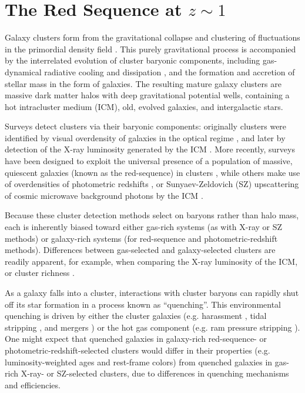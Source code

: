 \chapter{The Red Sequence at $z\sim1$}

Galaxy clusters form from the gravitational collapse and clustering of fluctuations in the primordial density field \citep{Press:1974aa,Gott:1975aa,Kravtsov:2012aa}.
This purely gravitational process is accompanied by the interrelated evolution of cluster baryonic components, including gas-dynamical radiative cooling and dissipation \citep{White:1978aa,Rudd:2008aa,Gnedin:2004aa,Kravtsov:2012aa}, and the formation and accretion of stellar mass in the form of galaxies. The resulting mature galaxy clusters are massive dark matter halos with deep gravitational potential wells, containing a hot intracluster medium (ICM), old, evolved galaxies, and intergalactic stars.

Surveys detect clusters via their baryonic components: originally clusters were identified by visual overdensity of galaxies in the optical regime \citep{Gunn:1986zm,Abell:1989lm,Lidman:1996uh,Ostrander:1998fx,Gal:2000lo}, and later by detection of the X-ray luminosity generated by the ICM \citep{Gioia:1994jm,Scharf:1997ws,Rosati:1998om,Romer:2000vp}. More recently, surveys have been designed to exploit the universal presence of a population of massive, quiescent galaxies (known as the red-sequence) in clusters \citep{Gladders:2000rq,Gladders:2005dp,Wilson:2009ws,Muzzin:2009jm,Rykoff:2014aa}, while others make use of overdensities of photometric redshifts \citep{Stanford:2005xr,Eisenhardt:2008pi}, or Sunyaev-Zeldovich (SZ) upscattering of cosmic microwave background photons by the ICM \citep{Reichardt:2013zn,Hasselfield:2013bs,Planck-Collaboration:2014aa,Bleem:2015sf}.

Because these cluster detection methods select on baryons rather than halo mass, each is inherently biased toward either gas-rich systems (as with X-ray or SZ methods) or galaxy-rich systems (for red-sequence and photometric-redshift methods).
Differences between gas-selected and galaxy-selected clusters are readily apparent, for example, when comparing the X-ray luminosity of the ICM, or cluster richness \citep{Donahue:2001fv,2008ApJ...675.1106R,Hicks:2013zl}.

As a galaxy falls into a cluster, interactions with cluster baryons can rapidly shut off its star formation in a process known as ``quenching''. This environmental quenching is driven by either the cluster galaxies (e.g. harassment \citep{Moore:1996aa}, tidal stripping \citep{Merritt:1983aa}, and mergers \citep{Toomre:1972aa,Rudnick:2012aa}) or the hot gas component (e.g. ram pressure stripping \citep{Gunn:1972aa,Quilis:2000aa}). One might expect that quenched galaxies in galaxy-rich red-sequence- or photometric-redshift-selected clusters would differ in their properties (e.g. luminosity-weighted ages and rest-frame colors) from quenched galaxies in gas-rich X-ray- or SZ-selected clusters, due to differences in quenching mechanisms and efficiencies.%


